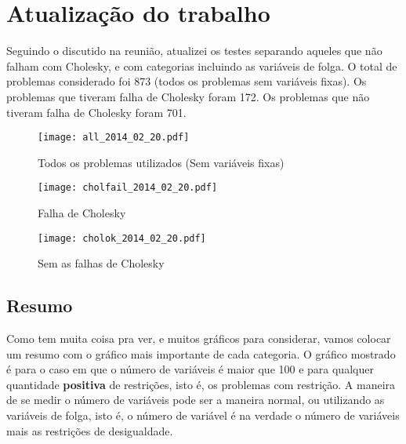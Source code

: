\documentclass{article}
\renewcommand{\emph}[1]{\textbf{#1}}
\begin{document}
\section{Atualização do trabalho}

Seguindo o discutido na reunião, atualizei os testes separando aqueles que não
falham com Cholesky, e com categorias incluindo as variáveis de folga.
O total de problemas considerado foi 873 (todos os problemas sem variáveis
fixas).
Os problemas que tiveram falha de Cholesky foram 172.
Os problemas que não tiveram falha de Cholesky foram 701.

\begin{figure}[H]
  \centering
  \texttt{[image: all\_2014\_02\_20.pdf]}
  \caption{Todos os problemas utilizados (Sem variáveis fixas) }
\end{figure}
\begin{figure}[H]
  \centering
  \texttt{[image: cholfail\_2014\_02\_20.pdf]}
  \caption{Falha de Cholesky}
\end{figure}
\begin{figure}[H]
  \centering
  \texttt{[image: cholok\_2014\_02\_20.pdf]}
  \caption{Sem as falhas de Cholesky}
\end{figure}

\newpage
\subsection{Resumo}

Como tem muita coisa pra ver, e muitos gráficos para considerar, vamos colocar
um resumo com o gráfico mais importante de cada categoria.
O gráfico mostrado é para o caso em que o número de variáveis é maior que 100 e
para qualquer quantidade \emph{positiva} de restrições, isto é, os problemas com
restrição. A maneira de se medir o número de variáveis pode ser a maneira
normal, ou utilizando as variáveis de folga, isto é, o número de variável é na
verdade o número de variáveis mais as restrições de desigualdade.
\end{document}

